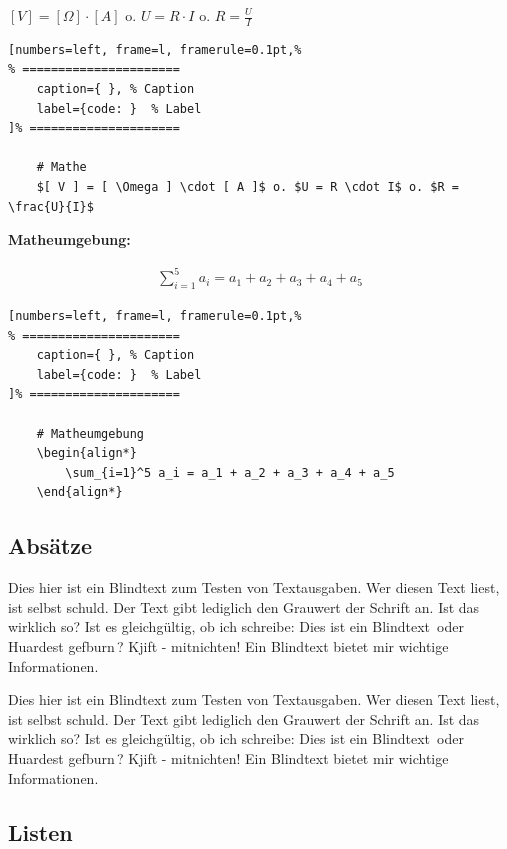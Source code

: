 $[ V ] = [ \Omega ] \cdot [ A ]$ o. $U = R \cdot I$ o.
$R = \frac{U}{I}$

\lstset{language=Bash} %
\begin{lstlisting}[numbers=left, frame=l, framerule=0.1pt,%
% ======================
	caption={ }, % Caption
	label={code: }  % Label
]% =====================

    # Mathe
    $[ V ] = [ \Omega ] \cdot [ A ]$ o. $U = R \cdot I$ o. $R = \frac{U}{I}$
\end{lstlisting}

\textbf{Matheumgebung:}

\begin{align*}
    \sum_{i=1}^5 a_i = a_1 + a_2 + a_3 + a_4 + a_5
\end{align*}

\lstset{language=Bash} %
\begin{lstlisting}[numbers=left, frame=l, framerule=0.1pt,%
% ======================
	caption={ }, % Caption
	label={code: }  % Label
]% =====================

    # Matheumgebung
    \begin{align*}
        \sum_{i=1}^5 a_i = a_1 + a_2 + a_3 + a_4 + a_5
    \end{align*}
\end{lstlisting}

\subsection{Absätze}\label{absaetze}

Dies hier ist ein Blindtext zum Testen von Textausgaben. Wer diesen Text
liest, ist selbst schuld. Der Text gibt lediglich den Grauwert der
Schrift an. Ist das wirklich so? Ist es gleichgültig, ob ich schreibe:
\frqq Dies ist ein Blindtext\flqq\, oder \frqq Huardest gefburn\flqq\,? Kjift -
mitnichten! Ein Blindtext bietet mir wichtige Informationen.

Dies hier ist ein Blindtext zum Testen von Textausgaben. Wer diesen Text
liest, ist selbst schuld. Der Text gibt lediglich den Grauwert der
Schrift an. Ist das wirklich so? Ist es gleichgültig, ob ich schreibe:
\frqq Dies ist ein Blindtext\flqq\, oder \frqq Huardest gefburn\flqq\,? Kjift -
mitnichten! Ein Blindtext bietet mir wichtige Informationen.

\subsection{Listen}\label{listen}

